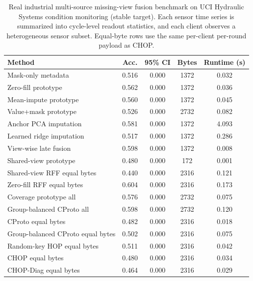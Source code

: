 \begin{table}[t]
\centering
\caption{Real industrial multi-source missing-view fusion benchmark on UCI Hydraulic Systems condition monitoring (stable target). Each sensor time series is summarized into cycle-level readout statistics, and each client observes a heterogeneous sensor subset. Equal-byte rows use the same per-client per-round payload as CHOP.}
\label{tab:if-hydraulic-fusion}
\scriptsize
\setlength{\tabcolsep}{3pt}
\renewcommand{\arraystretch}{0.94}
\begin{tabular}{lcccc}
\toprule
Method & Acc. & 95\% CI & Bytes & Runtime (s) \\
\midrule
Mask-only metadata & 0.516 & 0.000 & 1372 & 0.032 \\
Zero-fill prototype & 0.562 & 0.000 & 1372 & 0.036 \\
Mean-impute prototype & 0.560 & 0.000 & 1372 & 0.045 \\
Value+mask prototype & 0.526 & 0.000 & 2732 & 0.082 \\
Anchor PCA imputation & 0.581 & 0.000 & 1372 & 4.093 \\
Learned ridge imputation & 0.517 & 0.000 & 1372 & 0.286 \\
View-wise late fusion & 0.598 & 0.000 & 1372 & 0.008 \\
Shared-view prototype & 0.480 & 0.000 & 172 & 0.001 \\
Shared-view RFF equal bytes & 0.440 & 0.000 & 2316 & 0.121 \\
Zero-fill RFF equal bytes & 0.604 & 0.000 & 2316 & 0.173 \\
Coverage prototype all & 0.576 & 0.000 & 2732 & 0.075 \\
Group-balanced CProto all & 0.598 & 0.000 & 2732 & 0.120 \\
CProto equal bytes & 0.482 & 0.000 & 2316 & 0.018 \\
Group-balanced CProto equal bytes & 0.502 & 0.000 & 2316 & 0.075 \\
Random-key HOP equal bytes & 0.511 & 0.000 & 2316 & 0.042 \\
CHOP equal bytes & 0.480 & 0.000 & 2316 & 0.034 \\
CHOP-Diag equal bytes & 0.464 & 0.000 & 2316 & 0.029 \\
\bottomrule
\end{tabular}
\end{table}
